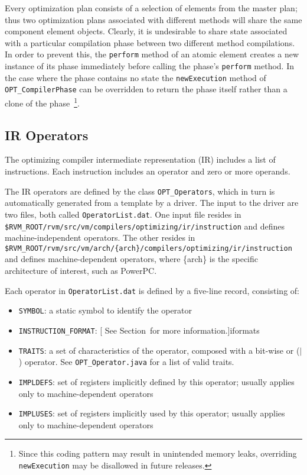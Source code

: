 Every optimization plan consists of a selection of elements from the master 
plan;
thus two optimization plans associated with different methods 
will share the same component element objects. 
Clearly, it is undesirable to share state 
associated with a particular compilation phase between two
different method compilations. In order to prevent this, the {\tt perform}
method of an atomic element creates a new instance of its phase immediately 
before calling the phase's {\tt perform} method. 
In the case where the phase
contains no state the {\tt newExecution} method of 
{\tt OPT\_CompilerPhase} can be overridden to return the phase itself rather 
than a clone of the phase~\footnote{Since this coding pattern may result
in unintended memory leaks, overriding {\tt newExecution} may be
disallowed in future releases.}.


\subsection{IR Operators}

The optimizing compiler intermediate representation (IR) includes a list
of instructions.  Each instruction includes an operator and zero or
more operands.

The IR operators are defined by the class {\tt OPT\_Operators}, which in
turn is automatically generated from a template by a driver.  The input to the
driver are two files, both called {\tt OperatorList.dat}.  One input
file resides in {\tt \$RVM\_ROOT/rvm/src/vm/compilers/optimizing/ir/instruction} and defines machine-independent
operators.  The other resides in {\tt \$RVM\_ROOT/rvm/src/vm/arch/\{arch\}/compilers/optimizing/ir/instruction}
and defines machine-dependent operators, where \{arch\} is the
specific architecture of interest, such as PowerPC\TMweb.

Each operator in {\tt OperatorList.dat} is defined by a five-line record,
consisting of:
\begin{itemize}
\item {\tt SYMBOL}: a static symbol to identify the operator
\item {\tt INSTRUCTION\_FORMAT}: [  See Section~\Ref for more information.]{iformats}
\item {\tt TRAITS}: a set of characteristics of the operator, composed with a bit-wise or ($|$) operator.  See {\tt OPT\_Operator.java} for a list of valid traits.
\item {\tt IMPLDEFS}: set of registers implicitly defined by this operator; usually applies only to machine-dependent operators
\item {\tt IMPLUSES}: set of registers implicitly used by this operator; usually applies only to machine-dependent operators
\end{itemize}

